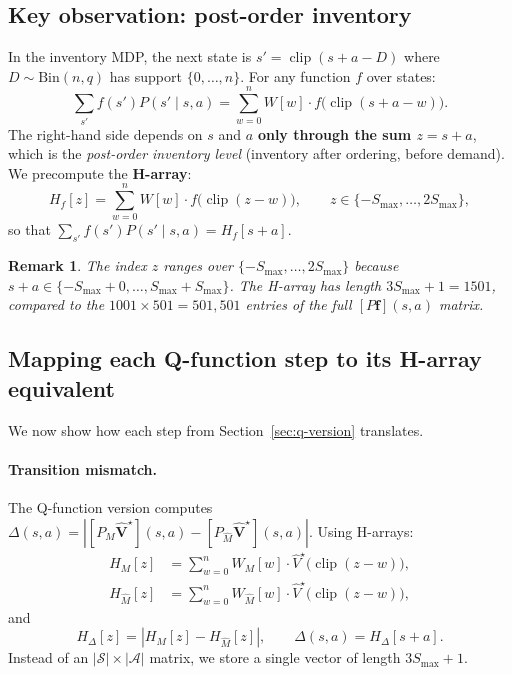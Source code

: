\documentclass[11pt]{article}
\newcommand{\Smax}{S_{\max}}
\newcommand{\clip}{\operatorname{clip}}
\newcommand{\Vhatstar}{\hat V^\star}
\newtheorem{remark}{Remark}
\begin{document}
\subsection{Key observation: post-order inventory}

In the inventory MDP, the next state is $s' = \clip(s + a - D)$ where
$D \sim \mathrm{Bin}(n, q)$ has support $\{0, \ldots, n\}$.  For any function
$f$ over states:
\begin{equation}\label{eq:h-array-identity}
  \sum_{s'} f(s')  P(s' \mid s, a)
  = \sum_{w=0}^{n} W[w] \cdot f\bigl(\clip(s + a - w)\bigr).
\end{equation}
The right-hand side depends on $s$ and $a$ \textbf{only through the sum
$z = s + a$}, which is the \emph{post-order inventory level} (inventory after
ordering, before demand).  We precompute the \textbf{H-array}:
\begin{equation}\label{eq:h-array}
  H_f[z] = \sum_{w=0}^{n} W[w] \cdot f\bigl(\clip(z - w)\bigr),
  \qquad z \in \{-\Smax,  \ldots,  2\Smax\},
\end{equation}
so that $\sum_{s'} f(s') P(s' \mid s, a) = H_f[s+a]$.

\begin{remark}
The index $z$ ranges over $\{-\Smax, \ldots, 2\Smax\}$ because
$s + a \in \{-\Smax + 0, \ldots, \Smax + \Smax\}$.  The H-array has length
$3\Smax + 1 = 1501$, compared to the $1001 \times 501 = 501{,}501$ entries of
the full $[P \mathbf{f}](s,a)$ matrix.
\end{remark}

\subsection{Mapping each Q-function step to its H-array equivalent}

We now show how each step from Section~\ref{sec:q-version} translates.

\paragraph{Transition mismatch.}
The Q-function version computes $\Delta(s,a) = |[P_M \hat{\mathbf{V}}^\star](s,a) -
[P_{\hat M} \hat{\mathbf{V}}^\star](s,a)|$.  Using H-arrays:
\begin{align}
  H_M[z] &= \sum_{w=0}^{n} W_M[w] \cdot \Vhatstar\bigl(\clip(z-w)\bigr),
  \label{eq:HM} \\
  H_{\hat M}[z] &= \sum_{w=0}^{n} W_{\hat M}[w] \cdot \Vhatstar\bigl(\clip(z-w)\bigr),
  \label{eq:HMhat}
\end{align}
and
\begin{equation}\label{eq:h-delta}
  H_\Delta[z] = |H_M[z] - H_{\hat M}[z]|,
  \qquad
  \Delta(s,a) = H_\Delta[s+a].
\end{equation}
Instead of an $|\mathcal{S}| \times |\mathcal{A}|$ matrix, we store a single
vector of length $3\Smax + 1$.
\end{document}
